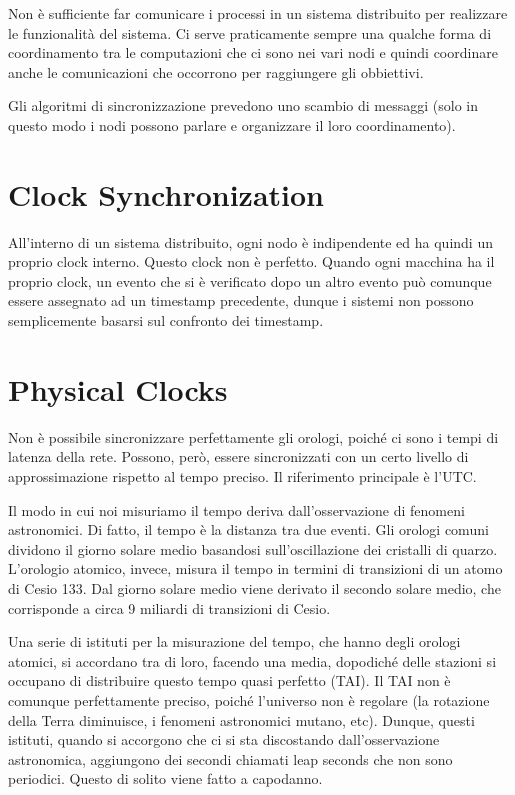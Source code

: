 Non è sufficiente far comunicare i processi in un sistema distribuito per realizzare le funzionalità del sistema. Ci serve praticamente sempre una qualche forma di coordinamento tra le computazioni che ci sono nei vari nodi e quindi coordinare anche le comunicazioni che occorrono per raggiungere gli obbiettivi.

Gli algoritmi di sincronizzazione prevedono uno scambio di messaggi (solo in questo modo i nodi possono parlare e organizzare il loro coordinamento).

\section{Clock Synchronization}

All'interno di un sistema distribuito, ogni nodo è indipendente ed ha quindi un proprio clock interno. Questo clock non è perfetto. Quando ogni macchina ha il proprio clock, un evento che si è verificato dopo un altro evento può comunque essere assegnato ad un timestamp precedente, dunque i sistemi non possono semplicemente basarsi sul confronto dei timestamp.

\section{Physical Clocks}

Non è possibile sincronizzare perfettamente gli orologi, poiché ci sono i tempi di latenza della rete. Possono, però, essere sincronizzati con un certo livello di approssimazione rispetto al tempo preciso. Il riferimento principale è l'UTC.

Il modo in cui noi misuriamo il tempo deriva dall'osservazione di fenomeni astronomici. Di fatto, il tempo è la distanza tra due eventi. Gli orologi comuni dividono il giorno solare medio basandosi sull'oscillazione dei cristalli di quarzo. L'orologio atomico, invece, misura il tempo in termini di transizioni di un atomo di Cesio 133. Dal giorno solare medio viene derivato il secondo solare medio, che corrisponde a circa 9 miliardi di transizioni di Cesio.

Una serie di istituti per la misurazione del tempo, che hanno degli orologi atomici, si accordano tra di loro, facendo una media, dopodiché delle stazioni si occupano di distribuire questo tempo quasi perfetto (TAI). Il TAI non è comunque perfettamente preciso, poiché l'universo non è regolare (la rotazione della Terra diminuisce, i fenomeni astronomici mutano, etc). Dunque, questi istituti, quando si accorgono che ci si sta discostando dall'osservazione astronomica, aggiungono dei secondi chiamati leap seconds che non sono periodici. Questo di solito viene fatto a capodanno.

